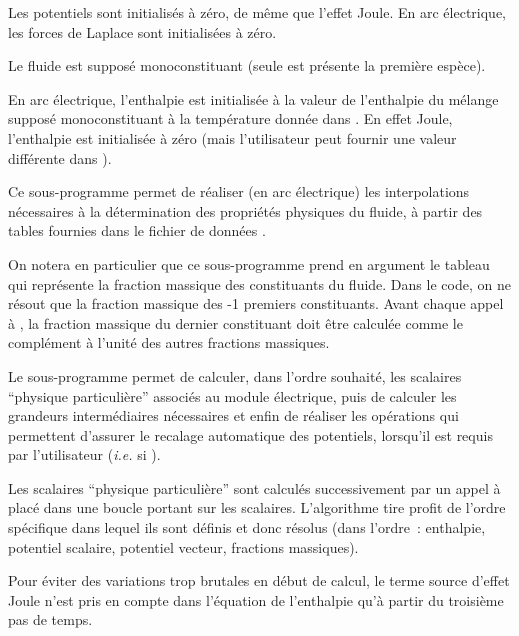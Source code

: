 Les potentiels sont initialis\'es \`a z\'ero, de m\^eme que l'effet Joule. En
arc \'electrique, les forces de Laplace sont initialis\'ees \`a z\'ero.

Le fluide est suppos\'e monoconstituant (seule est pr\'esente la premi\`ere
esp\`ece).

En arc \'electrique, l'enthalpie est initialis\'ee \`a la valeur de l'enthalpie du m\'elange
suppos\'e monoconstituant \`a la temp\'erature  donn\'ee
dans .  En effet Joule, l'enthalpie est initialis\'ee \`a z\'ero
(mais l'utilisateur peut fournir une valeur diff\'erente dans ).


Ce sous-programme permet de r\'ealiser (en arc \'electrique) les interpolations
n\'ecessaires \`a la d\'e\-ter\-mi\-na\-tion des propri\'et\'es physiques du fluide, \`a
partir des tables fournies dans le fichier de donn\'ees .

On notera en particulier que ce sous-programme prend en argument le tableau
 qui repr\'esente la fraction massique des 
constituants du fluide. Dans le code, on ne r\'esout que la fraction massique
des -1 premiers constituants. Avant chaque appel \`a ,
la fraction massique du dernier constituant doit \^etre calcul\'ee comme le
compl\'ement \`a l'unit\'e des autres fractions massiques.


Le sous-programme  permet de calculer, dans l'ordre souhait\'e,
les  scalaires ``physique particuli\`ere'' associ\'es au module
\'electrique, puis de calculer les grandeurs interm\'ediaires n\'e\-ces\-sai\-res et
enfin de
r\'ealiser les op\'erations qui permettent d'assurer le recalage automatique
des potentiels, lorsqu'il est requis par l'utilisateur ({\it i.e.} si ).

Les  scalaires ``physique particuli\`ere'' sont calcul\'es successivement par un
appel \`a  plac\'e dans une boucle portant sur les 
scalaires. L'algorithme tire profit de l'ordre sp\'ecifique dans lequel ils sont d\'efinis et donc
r\'esolus (dans l'ordre~: enthalpie, potentiel scalaire, potentiel vecteur, fractions massiques).

Pour \'eviter des variations trop brutales en d\'ebut de calcul, le terme source
d'effet Joule n'est pris en compte dans l'\'equation de l'enthalpie qu'\`a
partir du troisi\`eme pas de temps.

